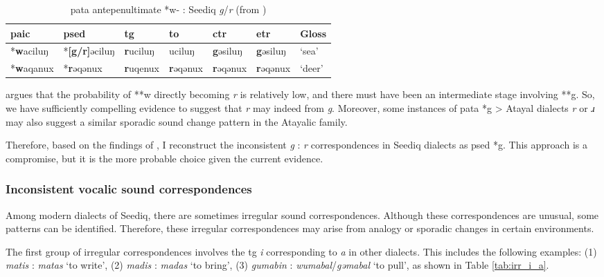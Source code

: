 \begin{table}[!htbp]
\centering
\caption{\acs{pata} antepenultimate *w- : Seediq \textit{g}/\textit{r} (from \cite[13]{song2024Aicg})}
\label{tab:song2024wgr}
\begin{tabular}{lllllll}
\hline
\acs{paic}    & \acs{psed}                & \acs{tg}             & \acs{to}             & \acs{ctr}            & \acs{etr}            & Gloss  \\ \hline
*\textbf{w}aciluŋ & *\textbf{[g/r]}əciluŋ & \textbf{r}uciluŋ & uciluŋ           & \textbf{g}əsiluŋ & \textbf{g}əsiluŋ & `sea'  \\
*\textbf{w}aqanux & *\textbf{r}əqənux    & \textbf{r}uqenux & \textbf{r}əqənux & \textbf{r}əqənux  & \textbf{r}əqənux     & `deer' \\ \hline
\end{tabular}
\end{table}

\textcite[13]{song2024Aicg} argues that the probability of **w directly becoming \textit{r} is relatively low, and there must have been an intermediate stage involving **g. So, we have sufficiently compelling evidence to suggest that \textit{r} may indeed from \textit{g}. Moreover, some instances of \acl{pata} *g > Atayal dialects \textit{r} or \textit{ɹ} may also suggest a similar sporadic sound change pattern in the Atayalic family. 

Therefore, based on the findings of \textcite{song2024Aicg}, I reconstruct the inconsistent \textit{g} : \textit{r} correspondences in Seediq dialects as \acl{psed} *g. This approach is a compromise, but it is the more probable choice given the current evidence.

\subsubsection{Inconsistent vocalic sound correspondences} \label{sec:weirdV}

Among modern dialects of Seediq, there are sometimes irregular sound correspondences. Although these correspondences are unusual, some patterns can be identified. Therefore, these irregular correspondences may arise from analogy or sporadic changes in certain environments.

The first group of irregular correspondences involves the \acl{tg} \textit{i} corresponding to \textit{a} in other dialects. This includes the following examples: (1) \textit{matis} : \textit{matas} `to write', (2) \textit{madis} : \textit{madas} `to bring', (3) \textit{gumabin} : \textit{wumabal}/\textit{gəmabal} `to pull', as shown in Table \ref{tab:irr_i_a}.

